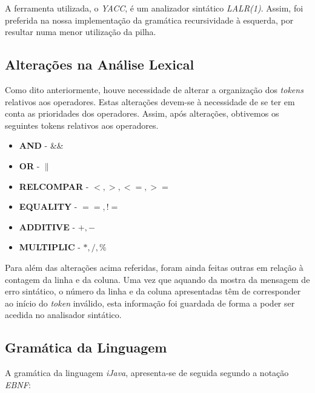 \documentclass[11pt,a4paper]{article}
\begin{document}
A ferramenta utilizada, o \textit{YACC}, é um analizador sintático \textit{LALR(1)}. Assim, foi preferida na nossa implementação da gramática recursividade à esquerda, por resultar numa menor utilização da pilha.

\subsection{Alterações na Análise Lexical}

Como dito anteriormente, houve necessidade de alterar a organização dos \textit{tokens} relativos aos operadores. Estas alterações devem-se à necessidade de se ter em conta as prioridades dos operadores. Assim, após alterações, obtivemos os seguintes tokens relativos aos operadores.

\begin{itemize}
	\item \textbf{AND} - \&\&
	\item \textbf{OR} - $\|$
	\item \textbf{RELCOMPAR} - $< , >, <= , >=$
	\item \textbf{EQUALITY} -  $== , !=$ 
	\item \textbf{ADDITIVE} - $+ , -$
	\item \textbf{MULTIPLIC} - $* , / , \% $
\end{itemize}

Para além das alterações acima referidas, foram ainda feitas outras em relação à contagem da linha e da coluna. Uma vez que aquando da mostra da mensagem de erro sintático, o número da linha e da coluna apresentadas têm de corresponder ao início do \textit{token} inválido, esta informação foi guardada de forma a poder ser acedida no analisador sintático.

\subsection{Gramática da Linguagem}

A gramática da linguagem \textit{iJava}, apresenta-se de seguida segundo a notação \textit{EBNF}: 
\vspace{0.5cm}
\end{document}
